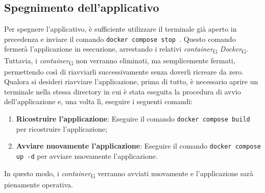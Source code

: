 \subsection{Spegnimento dell'applicativo}
Per spegnere l'applicativo, è sufficiente utilizzare il terminale già aperto in precedenza e inviare il comando \texttt{docker compose stop }. Questo comando fermerà l'applicazione in esecuzione, arrestando i relativi \textit{container}\textsubscript{G} \textit{Docker}\textsubscript{G}. Tuttavia, i \textit{container}\textsubscript{G} non verranno eliminati, ma semplicemente fermati, permettendo così di riavviarli successivamente senza doverli ricreare da zero. \\
Qualora si desideri riavviare l'applicazione, prima di tutto, è necessario aprire un terminale nella stessa directory in cui è stata eseguita la procedura di avvio dell'applicazione e, una volta lì, eseguire i seguenti comandi:
\begin{enumerate}
    \item \textbf{Ricostruire l'applicazione}: Eseguire il comando \texttt{docker compose build} per ricostruire l'applicazione;
    \item \textbf{Avviare nuovamente l'applicazione}: Eseguire il comando \texttt{docker compose up -d} per avviare nuovamente l'applicazione.
\end{enumerate}
In questo modo, i \textit{container}\textsubscript{G} verranno avviati nuovamente e l'applicazione sarà pienamente operativa.